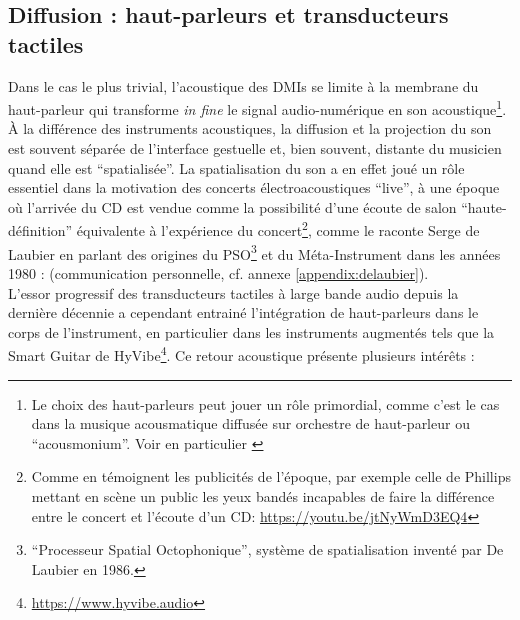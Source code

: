 \subsection{Diffusion : haut-parleurs et transducteurs tactiles}

\noindent Dans le cas le plus trivial, l'acoustique des \glspl{DMI} se limite à la membrane du haut-parleur qui transforme \textit{in fine} le signal audio-numérique en son acoustique\footnote{Le choix des haut-parleurs peut jouer un rôle primordial, comme c'est le cas dans la musique acousmatique diffusée sur orchestre de haut-parleur ou ``acousmonium''. Voir en particulier \cite{mooney_sound_2006}}. À la différence des instruments acoustiques, la diffusion et la projection du son est souvent séparée de l'interface gestuelle et, bien souvent, distante du musicien quand elle est ``spatialisée''. La spatialisation du son a en effet joué un rôle essentiel dans la motivation des concerts électroacoustiques ``live'', à une époque où l'arrivée du \gls{CD} est vendue comme la possibilité d'une écoute de salon ``haute-définition'' équivalente à l'expérience du concert\footnote{Comme en témoignent les publicités de l'époque, par exemple celle de Phillips mettant en scène un public les yeux bandés incapables de faire la différence entre le concert et l'écoute d'un \gls{CD}: \url{https://youtu.be/jtNyWmD3EQ4}}, comme le raconte Serge de Laubier en parlant des origines du PSO\footnote{``Processeur Spatial Octophonique'', système de spatialisation inventé par De Laubier en 1986.} et du Méta-Instrument dans les années 1980 :  (communication personnelle, cf. annexe \ref{appendix:delaubier}).\\
\indent L'essor progressif des transducteurs tactiles à large bande audio depuis la dernière décennie a cependant entrainé l'intégration de haut-parleurs dans le corps de l'instrument, en particulier dans les instruments augmentés tels que la Smart Guitar de HyVibe\footnote{\label{fn-hyvibe}\url{https://www.hyvibe.audio}}. Ce retour acoustique présente plusieurs intérêts :
\vspace{-1em}
